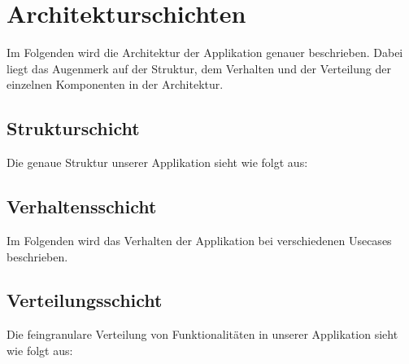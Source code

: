 \chapter{Architekturschichten}\label{ch:arrchitekturschichten}
Im Folgenden wird die Architektur der Applikation genauer beschrieben. Dabei liegt das Augenmerk 
auf der Struktur, dem Verhalten und der Verteilung der einzelnen Komponenten in der Architektur.


\section{Strukturschicht}\label{sec:strukturschicht}
Die genaue Struktur unserer Applikation sieht wie folgt aus:

\section{Verhaltensschicht}\label{sec:verhaltensschicht}
Im Folgenden wird das Verhalten der Applikation bei verschiedenen Usecases beschrieben.

\section{Verteilungsschicht}\label{sec:verteilungsschicht}
Die feingranulare Verteilung von Funktionalitäten in unserer Applikation sieht wie folgt aus:
